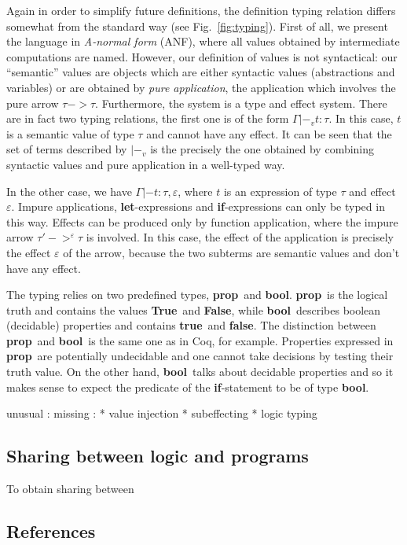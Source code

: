 \documentclass[a4paper]{llncs}
\newcommand{\letml}{{\bf let}}
\newcommand{\ifml}{{\bf if}}
\newcommand{\propml}{{\bf prop}}
\newcommand{\boolml}{{\bf bool}}
\newcommand{\Trueml}{{\bf True}}
\newcommand{\Falseml}{{\bf False}}
\newcommand{\trueml}{{\bf true}}
\newcommand{\falseml}{{\bf false}}
\newcommand{\coq}{Coq}
\begin{document}
Again in order to simplify future definitions, the definition typing relation
differs somewhat from the standard way (see Fig.~\ref{fig:typing}). First of
all, we present the language in {\em A-normal form} (ANF), where all values
obtained by intermediate computations are named. However, our definition of
values is not syntactical: our ``semantic'' values are objects which are
either syntactic values (abstractions and variables) or are obtained by {\em
pure application}, the application which involves the pure arrow $τ->τ$.
Furthermore, the system is a type and effect system. There are in fact two
typing relations, the first one is of the form $Γ|-_v  t : τ$. In this case,
$t$ is a semantic value of type $τ$ and cannot have any effect. It can be seen
that the set of terms described by $|-_v$ is the precisely the one obtained by
combining syntactic values and pure application in a well-typed way.

In the other case, we have $Γ|- t : τ, ε$, where $t$ is an expression of
type $τ$ and effect $ε$. Impure applications, \letml-expressions and
\ifml-expressions can only be typed in this way. Effects can be produced only
by function application, where the impure arrow $τ'->^ετ$ is involved. In this
case, the effect of the application is precisely the effect $ε$ of the arrow,
because the two subterms are semantic values and don't have any effect.

The typing relies on two predefined types, \propml\ and \boolml. \propml\ is
the logical truth and contains the values \Trueml\ and \Falseml, while
\boolml\ describes boolean (decidable) properties and contains \trueml\ and
\falseml. The distinction between \propml\ and \boolml\ is the same one as in
\coq, for example. Properties expressed in \propml\ are potentially
undecidable and one cannot take decisions by testing their truth value. On the
other hand, \boolml\ talks about decidable properties and so it makes sense to
expect the predicate of the \ifml-statement to be of type \boolml.


unusual : 
missing : 
* value injection
* subeffecting
* logic typing


\subsection{Sharing between logic and programs}

To obtain sharing between
\subsection{References}
\end{document}
